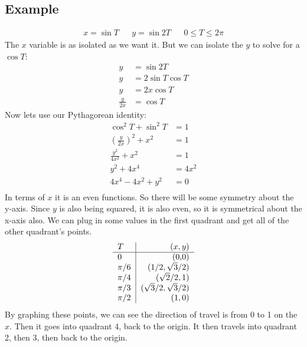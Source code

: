 \documentclass{report}
\begin{document}
    \subsection{Example}
        \begin{align*}
            x = \sin T &&
            y = \sin 2T &&
            0 \leq T \leq 2 \pi
        \end{align*}
        The \(x\) variable is as isolated as we want it.
        But we can isolate the \(y\) to solve for a \(\cos T\):
        \begin{align*}
            y &= \sin 2T \\
            y &= 2 \sin T \cos T \\
            y &= 2 x \cos T \\
            \frac{y}{2x} &= \cos T
        \end{align*}
        Now lets use our Pythagorean identity:
        \begin{align*}
            \cos^2 T + \sin^2 T &= 1 \\
            \left(\frac{y}{2x}\right)^2 + x^2 &= 1 \\
            \frac{y^2}{4x^2} + x^2 &= 1 \\
            y^2 + 4x^4 &= 4x^2 \\
            4x^4 - 4x^2 + y^2 &= 0 \\
        \end{align*}
        In terms of \(x\) it is an even functions. So there will be some symmetry about the y-axis.
        Since \(y\) is also being squared, it is also even, so it is symmetrical about the x-axis also.
        We can plug in some values in the first quadrant and get all of the other quadrant's points.
        \begin{align*}
            \begin{tabular}{l | r}
                \(T\) & \((x, y)\) \\
                \hline
                0 & (0,0) \\
                \(\pi / 6\) & \((1/2, \sqrt{3}/2)\) \\
                \(\pi / 4\) & \((\sqrt{2} / 2, 1)\) \\
                \(\pi / 3\) & \((\sqrt{3} / 2, \sqrt{3} / 2)\) \\
                \(\pi / 2\) & \((1, 0)\) 
            \end{tabular}
        \end{align*}
        By graphing these points, we can see the direction of travel is from 0 to 1 on the \(x\). 
        Then it goes into quadrant 4, back to the origin.
        It then travels into quadrant 2, then 3, then back to the origin.
    
\end{document}
